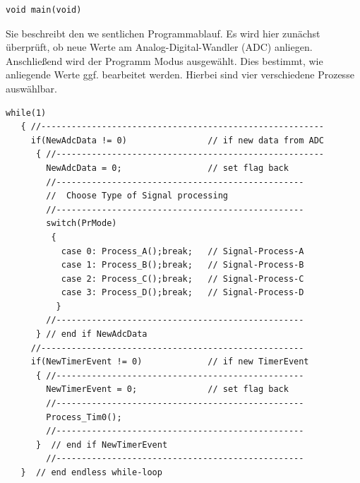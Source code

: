 \documentclass[a4paper,12pt,fontsize=12,DIV=12]{scrartcl}
\begin{document}
\begin{lstlisting}
void main(void)
\end{lstlisting}
Sie beschreibt den we
sentlichen Programmablauf. Es wird hier zunächst überprüft, ob neue Werte am Analog-Digital-Wandler (ADC) anliegen. Anschließend wird der Programm Modus ausgewählt. Dies bestimmt, wie anliegende Werte ggf. bearbeitet werden. Hierbei sind vier verschiedene Prozesse auswählbar.


\begin{lstlisting}[title=Endlosschleife in Main.c]
   while(1)
   { //--------------------------------------------------------
     if(NewAdcData != 0)                // if new data from ADC
      { //-----------------------------------------------------
        NewAdcData = 0;                 // set flag back   
        //-------------------------------------------------
        //  Choose Type of Signal processing                 
        //-------------------------------------------------
        switch(PrMode) 
         {
           case 0: Process_A();break;   // Signal-Process-A
           case 1: Process_B();break;   // Signal-Process-B
           case 2: Process_C();break;   // Signal-Process-C
           case 3: Process_D();break;   // Signal-Process-D
          }
        //-------------------------------------------------
      } // end if NewAdcData
     //----------------------------------------------------
     if(NewTimerEvent != 0)             // if new TimerEvent
      { //-------------------------------------------------
        NewTimerEvent = 0;              // set flag back    
        //-------------------------------------------------
        Process_Tim0();
        //-------------------------------------------------
      }  // end if NewTimerEvent
        //-------------------------------------------------
   }  // end endless while-loop
\end{lstlisting}
\end{document}
